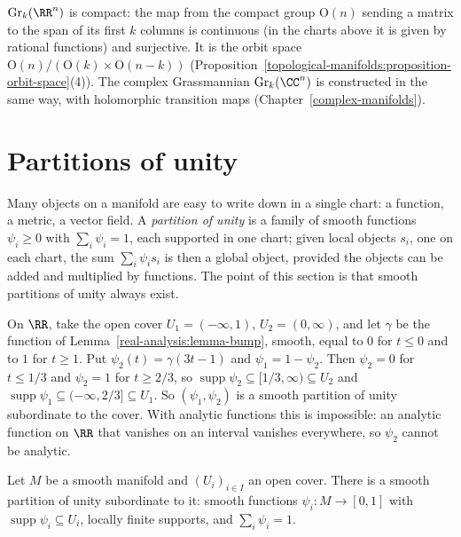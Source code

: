 \begin{remark}\label{smooth-manifolds:remark-grassmannian}
$\mathrm{Gr}_k(\RR^n)$ is compact: the map from the compact group $\mathrm{O}(n)$ sending a matrix to the span of its first $k$ columns is continuous (in the charts above it is given by rational functions) and surjective. It is the
orbit space $\mathrm{O}(n)/(\mathrm{O}(k) \times \mathrm{O}(n - k))$ (Proposition~\ref{topological-manifolds:proposition-orbit-space}(4)). The complex Grassmannian $\mathrm{Gr}_k(\CC^n)$ is constructed in the same way, with
holomorphic transition maps (Chapter~\ref{complex-manifolds}).
\end{remark}

\section{Partitions of unity}\label{smooth-manifolds:section-partitions}

Many objects on a manifold are easy to write down in a single chart: a function, a metric, a vector field. A \emph{partition of unity} is a family of smooth
functions $\psi_i \geq 0$ with $\sum_i\psi_i = 1$, each supported in one chart; given local objects $s_i$, one on each chart, the sum $\sum_i\psi_is_i$ is then a
global object, provided the objects can be added and multiplied by functions. The point of this section is that smooth partitions of unity always exist.

\begin{example}\label{smooth-manifolds:example-partition-line}
On $\RR$, take the open cover $U_1 = (-\infty, 1)$, $U_2 = (0, \infty)$, and let $\gamma$ be the function of Lemma~\ref{real-analysis:lemma-bump}, smooth,
equal to $0$ for $t \leq 0$ and to $1$ for $t \geq 1$. Put $\psi_2(t) = \gamma(3t - 1)$ and $\psi_1 = 1 - \psi_2$. Then $\psi_2 = 0$ for $t \leq 1/3$ and
$\psi_2 = 1$ for $t \geq 2/3$, so $\operatorname{supp}\psi_2 \subseteq [1/3, \infty) \subseteq U_2$ and $\operatorname{supp}\psi_1 \subseteq (-\infty, 2/3]
\subseteq U_1$. So $(\psi_1, \psi_2)$ is a smooth partition of unity subordinate to the cover. With analytic functions this is impossible: an analytic
function on $\RR$ that vanishes on an interval vanishes everywhere, so $\psi_2$ cannot be analytic.
\end{example}

\begin{theorem}\label{smooth-manifolds:theorem-partitions-of-unity}
Let $M$ be a smooth manifold and $(U_i)_{i \in I}$ an open cover. There is a smooth partition of unity subordinate to it: smooth functions $\psi_i \colon M \to [0, 1]$ with
$\operatorname{supp}\psi_i \subseteq U_i$, locally finite supports, and $\sum_i\psi_i = 1$.
\end{theorem}

